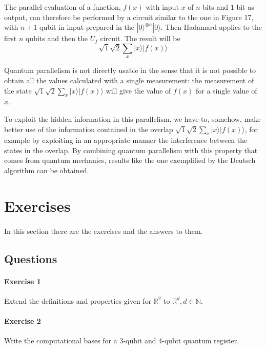 \documentclass[a4paper,10pt]{article}
\begin{document}
The parallel evaluation of a function, $f(x)$ with input $x$ of $n$ bits and $1$ bit as output, can therefore be performed by a circuit similar to the one in Figure 17, with $n+1$ qubit in input prepared in the $|0\rangle^{\otimes n}|0\rangle$. Then Hadamard applies to the first $n$ qubits and then the $U_f$ circuit. The result will be
$$\sqrt{1}{\sqrt{2}}\sum\limits_{x}|x\rangle|f(x)\rangle$$

Quantum parallelism is not directly usable in the sense that it is not possible to obtain all the values calculated with a single measurement: the measurement of the state $\sqrt{1}{\sqrt{2}}\sum\limits_{x}|x\rangle|f(x)\rangle$ will give the value of $f(x)$ for a single value of $x$.

To exploit the hidden information in this parallelism, we have to, somehow, make better use of the information contained in the overlap $\sqrt{1}{\sqrt{2}}\sum\limits_{x}|x\rangle|f(x)\rangle$, for example by exploiting in an appropriate manner the interference between the states in the overlap. By combining quantum parallelism with this property that comes from quantum mechanics, results like the one exemplified by the Deutsch algorithm can be obtained.



\newpage

\section{Exercises}
\label{exs}
\paragraph{} In this section there are the exercises and the answers to them. 
\subsection{Questions}
\paragraph{Exercise 1}
\label{ex01q}
Extend the definitions and properties given for $\mathbb{R}^2$ to $\mathbb{R}^d, d \in \mathbb{N}$.

\paragraph{Exercise 2}
\label{ex02q}
Write the computational bases for a 3-qubit and 4-qubit quantum register.
\end{document}
